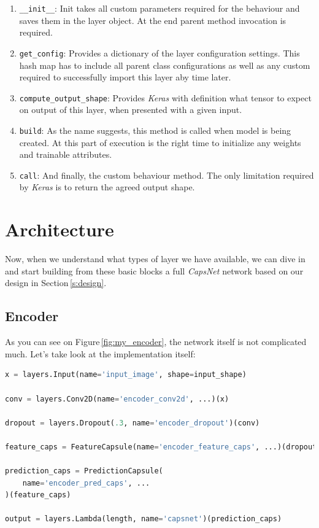 \begin{enumerate}
    \item \texttt{\_\_init\_\_}: Init takes all custom parameters required for the behaviour and saves them in the layer object. At the end parent method invocation is required.
    \item \texttt{get\_config}: Provides a dictionary of the layer configuration settings. This hash map has to include all parent class configurations as well as any custom required to successfully import this layer aby time later.
    \item \texttt{compute\_output\_shape}: Provides \textit{Keras} with definition what tensor to expect on output of this layer, when presented with a given input.
    \item \texttt{build}: As the name suggests, this method is called when model is being created. At this part of execution is the right time to initialize any weights and trainable attributes.
    \item \texttt{call}: And finally, the custom behaviour method. The only limitation required by \textit{Keras} is to return the agreed output shape.
\end{enumerate}

\section{Architecture}

Now, when we understand what types of layer we have available, we can dive in and start building from these basic blocks a full \textit{CapsNet} network based on our design in Section\,\ref{s:design}.

\subsection{Encoder}

As you can see on Figure\,\ref{fig:my_encoder}, the network itself is not complicated much. Let's take look at the implementation itself:

\begin{lstlisting}[language=Python, caption=Features capsule with squash activation.]
x = layers.Input(name='input_image', shape=input_shape)

conv = layers.Conv2D(name='encoder_conv2d', ...)(x)

dropout = layers.Dropout(.3, name='encoder_dropout')(conv)

feature_caps = FeatureCapsule(name='encoder_feature_caps', ...)(dropout)

prediction_caps = PredictionCapsule(
    name='encoder_pred_caps', ...
)(feature_caps)

output = layers.Lambda(length, name='capsnet')(prediction_caps)
\end{lstlisting}

